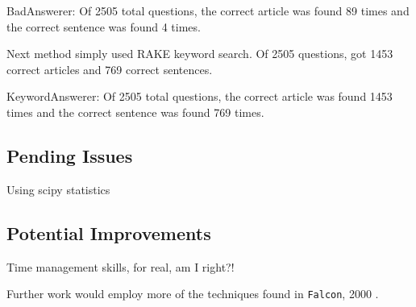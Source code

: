 \documentclass[11pt]{article}
\begin{document}
BadAnswerer: Of 2505 total questions, the correct article was found 89 times and the correct sentence was found 4 times.

Next method simply used RAKE keyword search. Of 2505 questions, got 1453 correct articles and 769 correct sentences.

KeywordAnswerer: Of 2505 total questions, the correct article was found 1453 times and the correct sentence was found 769 times.

\subsection{Pending Issues}

Using scipy statistics

\subsection{Potential Improvements}

Time management skills, for real, am I right?!

Further work would employ more of the techniques found in \texttt{Falcon}, 2000 \cite{falcon2000}. 

{}

\end{document}
